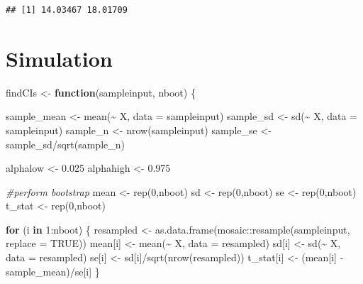 \documentclass[12pt]{article}
\newenvironment{Shaded}{\begin{snugshade}}{\end{snugshade}}
\newcommand{\AttributeTok}[1]{\textcolor[rgb]{0.77,0.63,0.00}{#1}}
\newcommand{\CommentTok}[1]{\textcolor[rgb]{0.56,0.35,0.01}{\textit{#1}}}
\newcommand{\ConstantTok}[1]{\textcolor[rgb]{0.00,0.00,0.00}{#1}}
\newcommand{\ControlFlowTok}[1]{\textcolor[rgb]{0.13,0.29,0.53}{\textbf{#1}}}
\newcommand{\DecValTok}[1]{\textcolor[rgb]{0.00,0.00,0.81}{#1}}
\newcommand{\FloatTok}[1]{\textcolor[rgb]{0.00,0.00,0.81}{#1}}
\newcommand{\FunctionTok}[1]{\textcolor[rgb]{0.00,0.00,0.00}{#1}}
\newcommand{\NormalTok}[1]{#1}
\newcommand{\OtherTok}[1]{\textcolor[rgb]{0.56,0.35,0.01}{#1}}
\newcommand{\SpecialCharTok}[1]{\textcolor[rgb]{0.00,0.00,0.00}{#1}}
\begin{document}
\begin{verbatim}
## [1] 14.03467 18.01709
\end{verbatim}

\hypertarget{simulation}{%
\section{Simulation}\label{simulation}}

\begin{Shaded}
\begin{Highlighting}[]
\NormalTok{findCIs }\OtherTok{\textless{}{-}} \ControlFlowTok{function}\NormalTok{(sampleinput, nboot) \{}
  
\NormalTok{  sample\_mean }\OtherTok{\textless{}{-}} \FunctionTok{mean}\NormalTok{(}\SpecialCharTok{\textasciitilde{}}\NormalTok{ X, }\AttributeTok{data =}\NormalTok{ sampleinput)}
\NormalTok{  sample\_sd }\OtherTok{\textless{}{-}} \FunctionTok{sd}\NormalTok{(}\SpecialCharTok{\textasciitilde{}}\NormalTok{ X, }\AttributeTok{data =}\NormalTok{ sampleinput)}
\NormalTok{  sample\_n }\OtherTok{\textless{}{-}} \FunctionTok{nrow}\NormalTok{(sampleinput)}
\NormalTok{  sample\_se }\OtherTok{\textless{}{-}}\NormalTok{ sample\_sd}\SpecialCharTok{/}\FunctionTok{sqrt}\NormalTok{(sample\_n)}
  
\NormalTok{  alphalow }\OtherTok{\textless{}{-}} \FloatTok{0.025}
\NormalTok{  alphahigh }\OtherTok{\textless{}{-}} \FloatTok{0.975}
  
  \CommentTok{\#perform bootstrap}
\NormalTok{  mean }\OtherTok{\textless{}{-}} \FunctionTok{rep}\NormalTok{(}\DecValTok{0}\NormalTok{,nboot)}
\NormalTok{  sd }\OtherTok{\textless{}{-}} \FunctionTok{rep}\NormalTok{(}\DecValTok{0}\NormalTok{,nboot)}
\NormalTok{  se }\OtherTok{\textless{}{-}} \FunctionTok{rep}\NormalTok{(}\DecValTok{0}\NormalTok{,nboot)}
\NormalTok{  t\_stat }\OtherTok{\textless{}{-}} \FunctionTok{rep}\NormalTok{(}\DecValTok{0}\NormalTok{,nboot)}

  \ControlFlowTok{for}\NormalTok{ (i }\ControlFlowTok{in} \DecValTok{1}\SpecialCharTok{:}\NormalTok{nboot) \{}
\NormalTok{    resampled }\OtherTok{\textless{}{-}} \FunctionTok{as.data.frame}\NormalTok{(mosaic}\SpecialCharTok{::}\FunctionTok{resample}\NormalTok{(sampleinput, }\AttributeTok{replace =} \ConstantTok{TRUE}\NormalTok{))}
\NormalTok{    mean[i] }\OtherTok{\textless{}{-}} \FunctionTok{mean}\NormalTok{(}\SpecialCharTok{\textasciitilde{}}\NormalTok{ X, }\AttributeTok{data =}\NormalTok{ resampled)}
\NormalTok{    sd[i] }\OtherTok{\textless{}{-}} \FunctionTok{sd}\NormalTok{(}\SpecialCharTok{\textasciitilde{}}\NormalTok{ X, }\AttributeTok{data =}\NormalTok{ resampled)}
\NormalTok{    se[i] }\OtherTok{\textless{}{-}}\NormalTok{ sd[i]}\SpecialCharTok{/}\FunctionTok{sqrt}\NormalTok{(}\FunctionTok{nrow}\NormalTok{(resampled))}
\NormalTok{    t\_stat[i] }\OtherTok{\textless{}{-}}\NormalTok{ (mean[i] }\SpecialCharTok{{-}}\NormalTok{ sample\_mean)}\SpecialCharTok{/}\NormalTok{se[i]}
\NormalTok{  \}}


\end{Highlighting}
\end{Shaded}
\end{document}

